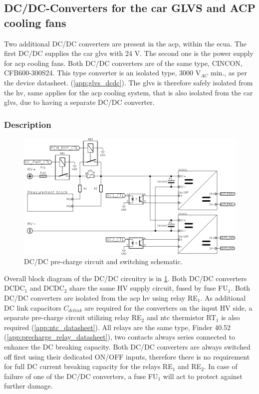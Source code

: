 \subsection {DC/DC-Converters for the car GLVS and ACP cooling fans}
Two additional DC/DC converters are present in the \gls{acp}, within the \gls{ecua}. The first DC/DC supplies the car \gls{glvs} with 24 V. The second one is the power supply for \gls{acp} cooling fans. Both DC/DC converters are of the same type, CINCON, CFB600-300S24. This type converter is an isolated type, 3000 V$_{AC}$ min., as per the device datasheet. (\ref{app:glvs_dcdc}). The \gls{glvs} is therefore safely isolated from the \gls{hv}, same applies for the \gls{acp} cooling system, that is also isolated from the car \gls{glvs}, due to having a separate DC/DC converter.

\subsubsection{Description}

\begin{figure}[H]
	\centering
	\includegraphics[width=\textwidth,clip]{./img/ECUA_DCDC_PRECHARGE.pdf}
	\caption{DC/DC pre-charge circuit and switching schematic.}
	\label{fig:precharge_dcdc_sch}
\end{figure}

Overall block diagram of the DC/DC circuitry is in \ref{fig:precharge_dcdc_sch}. Both DC/DC converters DCDC$_1$ and DCDC$_2$ share the same HV supply circuit, fused by fuse FU$_1$. Both DC/DC converters are isolated from the \gls{acp} \gls{hv} using relay RE$_1$. As additional DC link capacitors $C_{dclink}$ are required for the converters on the input HV side, a separate pre-charge circuit utilizing relay RE$_2$ and \gls{ntc} thermistor RT$_1$ is also required (\ref{app:ntc_datasheet}). 
All relays are the same type, Finder 40.52 (\ref{app:precharge_relay_datasheet}), two contacts always series connected to enhance the DC breaking capacity. Both DC/DC converters are always switched off first using their dedicated ON/OFF inputs, therefore there is no requirement for full DC current breaking capacity for the relays RE$_1$ and RE$_2$. In case of failure of one of the DC/DC converters, a fuse FU$_1$ will act to protect against further damage.

